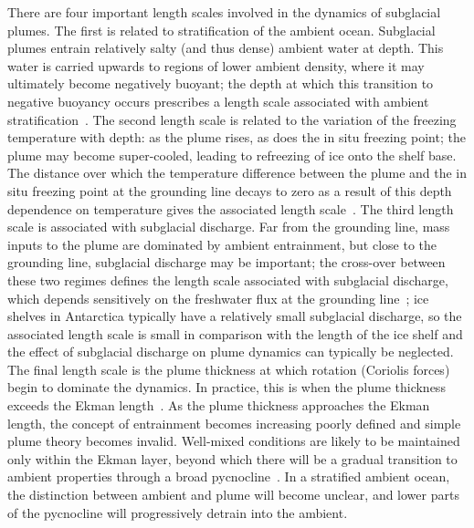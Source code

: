 \documentclass[openacc]{rsproca_new}%
\begin{document}
There are four important length scales involved in the dynamics of subglacial plumes. The first is related to stratification of the ambient ocean. Subglacial plumes entrain relatively salty (and thus dense) ambient water at depth. This water  is carried upwards to regions of lower ambient density, where it may ultimately become negatively buoyant; the depth at which this transition to negative buoyancy occurs prescribes a length scale associated with ambient stratification~\cite{Magorrian2016JGeoResOcean}. The second length scale is related to the variation of the freezing temperature with depth: as the plume rises, as does the in situ freezing point; the plume may become super-cooled, leading to refreezing of ice onto the shelf base. The distance over which the temperature difference between the plume and the in situ freezing point at the grounding line decays to zero as a result of this depth dependence on temperature gives the associated length scale~\cite{LaneSerff1995JGeophysResOceans}. The third length scale is associated with subglacial discharge. Far from the grounding line, mass inputs to the plume are dominated by ambient entrainment, but close to the grounding line, subglacial discharge may be important; the cross-over between these two regimes defines the length scale associated with subglacial discharge, which depends sensitively on the freshwater flux at the grounding line~\cite{Jenkins2011JPhysOcean}; ice shelves in Antarctica typically have a relatively small subglacial discharge, so the associated length scale is small in comparison with the length of the ice shelf and the effect of subglacial discharge on plume dynamics can typically be neglected. The final length scale is the plume thickness at which rotation (Coriolis forces) begin to dominate the dynamics. In practice, this is when the plume thickness exceeds the Ekman length~\cite{Jenkins2011JPhysOcean}. As the plume thickness approaches the Ekman length, the concept of entrainment becomes increasing poorly defined and simple plume theory becomes invalid.  Well-mixed conditions are likely to be maintained only within the Ekman layer, beyond which there will be a gradual transition to ambient properties through a broad pycnocline~\cite{Jenkins2021JPO}.  In a stratified ambient ocean, the distinction between ambient and plume will become unclear, and lower parts of the pycnocline will progressively detrain into the ambient.
\end{document}
